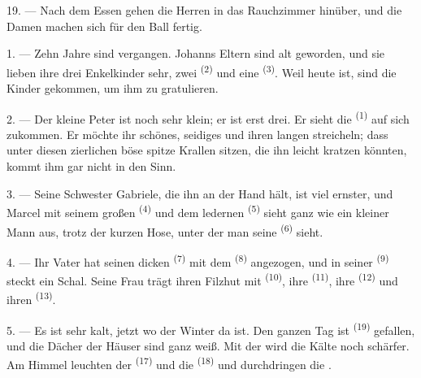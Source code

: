 19. --- Nach dem Essen gehen die Herren in das Rauchzimmer hinüber, und die Damen
machen sich für den Ball fertig.

\VUsaut{5.0mm}
\VUsaut{1.6mm}
\VUsaut{2.6mm}

\VUsaut{3.0mm}

1. --- Zehn Jahre sind vergangen. Johanns Eltern sind alt geworden, und sie lieben
ihre drei Enkelkinder sehr, zwei  \textsuperscript{(2)} und eine
 \textsuperscript{(3)}. Weil heute 
ist, sind die Kinder gekommen, um ihm zu gratulieren.

2. --- Der kleine Peter ist noch sehr klein; er ist erst drei. Er sieht die
 \textsuperscript{(1)} auf sich zukommen. Er möchte ihr schönes,
seidiges  und ihren langen  streicheln; dass unter
diesen zierlichen  böse spitze Krallen sitzen, die ihn leicht
kratzen könnten, kommt ihm gar nicht in den Sinn.

3. --- Seine Schwester Gabriele, die ihn an der Hand hält, ist viel ernster, und
Marcel mit seinem großen  \textsuperscript{(4)} und dem ledernen
 \textsuperscript{(5)} sieht ganz wie ein kleiner Mann aus, trotz der
kurzen Hose, unter der man seine  \textsuperscript{(6)} sieht.

4. --- Ihr Vater hat seinen dicken  \textsuperscript{(7)} mit
dem  \textsuperscript{(8)} angezogen, und in seiner
 \textsuperscript{(9)} steckt ein Schal. Seine Frau trägt ihren
Filzhut mit  \textsuperscript{(10)}, ihre 
\textsuperscript{(11)}, ihre  \textsuperscript{(12)} und ihren
 \textsuperscript{(13)}.

5. --- Es ist sehr kalt, jetzt wo der Winter da ist. Den ganzen Tag ist
 \textsuperscript{(19)} gefallen, und die Dächer der Häuser sind ganz
weiß. Mit der  wird die Kälte noch schärfer. Am Himmel leuchten der
 \textsuperscript{(17)} und die  \textsuperscript{(18)}
und durchdringen die .

\VUsaut{4.2mm}
\VUsaut{3.0mm}

